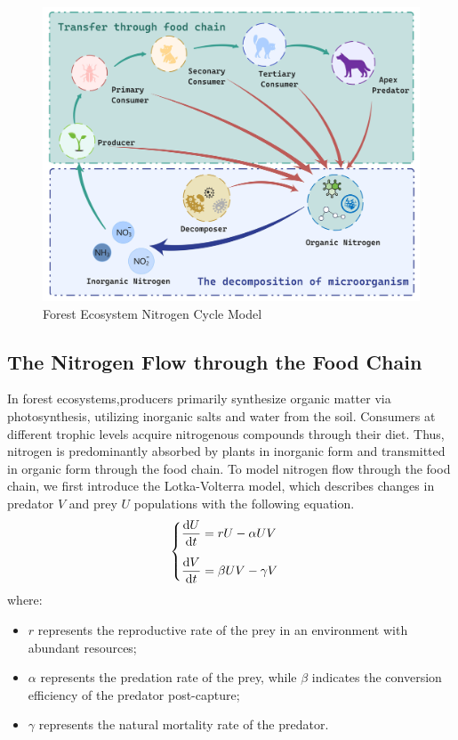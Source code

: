 \documentclass{mcmthesis}
\begin{document}
\begin{figure}[h] 
\centering
\includegraphics[width=12cm]{figures/forest ecosystem.jpg}
\caption{Forest Ecosystem Nitrogen Cycle Model}
\label{fig:forest_system}
\end{figure}

\subsection{The Nitrogen Flow through the Food Chain}
In forest ecosystems,producers primarily synthesize organic matter via photosynthesis, utilizing inorganic salts and water from the soil. Consumers at different trophic levels acquire nitrogenous compounds through their diet. Thus, nitrogen is predominantly absorbed by plants in inorganic form and transmitted in organic form through the food chain. To model nitrogen flow through the food chain, we first introduce the Lotka-Volterra model\cite{volterra1928variations}, which describes changes in predator $V$ and prey $U$ populations with the following equation.
\begin{align}
   \begin{cases}
        \displaystyle \vspace{10pt}
    \frac{\mathrm{d}U}{\mathrm{d}t} =  r U - \alpha UV \\
        \displaystyle
    \frac{\mathrm{d}V}{\mathrm{d}t} = \beta UV - \gamma V
    \end{cases}
\label{eq: LV}
\end{align}
where:
\begin{itemize} 
\item $r$ represents the reproductive rate of the prey in an environment with abundant resources; 
\item $\alpha$ represents the predation rate of the prey, while $\beta$ indicates the conversion efficiency of the predator post-capture; 
\item $\gamma$ represents the natural mortality rate of the predator. \end{itemize}
\end{document}
